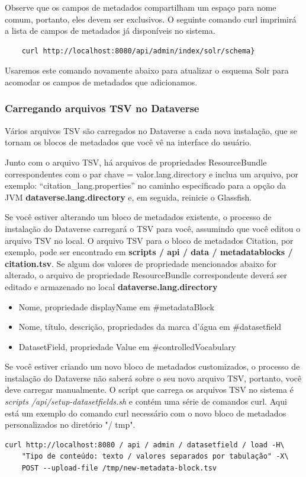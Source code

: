 \documentclass[12pt,hidelinks]{article}
\begin{document}
\qquad Observe que os campos de metadados compartilham um espaço para nome comum, portanto, eles devem ser exclusivos. O seguinte comando curl imprimirá a lista de campos de metadados já disponíveis no sistema.
    \begin{verbatim}
    curl http://localhost:8080/api/admin/index/solr/schema}
    \end{verbatim}
Usaremos este comando novamente abaixo para atualizar o esquema Solr para acomodar os campos de metadados que adicionamos.

\subsubsection{Carregando arquivos TSV no Dataverse}

\qquad Vários arquivos TSV são carregados no Dataverse a cada nova instalação, que se tornam os blocos de metadados que você vê na interface do usuário.

Junto com o arquivo TSV, há arquivos de propriedades ResourceBundle correspondentes com o par chave = valor.lang.directory e inclua um arquivo, por exemplo: “citation\_lang.properties” no caminho especificado para a opção da JVM 
\textbf{dataverse.lang.directory} e, em seguida, reinicie o Glassfish.

Se você estiver alterando um bloco de metadados existente, o processo de instalação do Dataverse carregará o TSV para você, assumindo que você editou o arquivo TSV no local. O arquivo TSV para o bloco de metadados Citation, por exemplo, pode ser encontrado em  \textbf{scripts / api / data / metadatablocks / citation.tsv}. Se algum dos valores de propriedade mencionados abaixo for alterado, o arquivo de propriedade ResourceBundle correspondente deverá ser editado e armazenado no local \textbf{dataverse.lang.directory}

\begin{itemize}
    
\item Nome, propriedade displayName em \#metadataBlock
\item Nome, título, descrição, propriedades da marca d'água em \#datasetfield
\item DatasetField, propriedade Value em \#controlledVocabulary

\end{itemize}

Se você estiver criando um novo bloco de metadados customizados, o processo de instalação do Dataverse não saberá sobre o seu novo arquivo TSV, portanto, você deve carregar manualmente. O script que carrega os arquivos TSV no sistema é \textit{scripts /api/setup-datasetfields.sh} e contém uma série de comandos curl. Aqui está um exemplo do comando curl necessário com o novo bloco de metadados personalizados no diretório "/ tmp".
\begin{verbatim}
curl http://localhost:8080 / api / admin / datasetfield / load -H\
    "Tipo de conteúdo: texto / valores separados por tabulação" -X\
    POST --upload-file /tmp/new-metadata-block.tsv
\end{verbatim}
\end{document}
